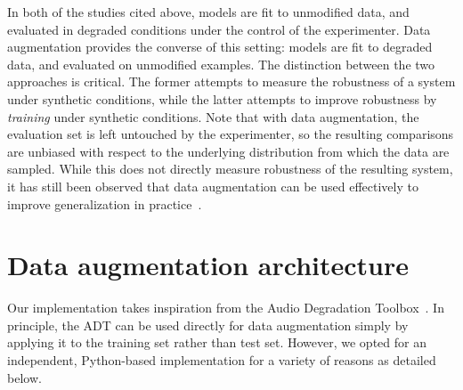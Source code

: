 \documentclass{article}
\begin{document}
In both of the studies cited above, models are fit to unmodified data, and evaluated in
degraded conditions under the control of the experimenter.  
Data augmentation provides the converse of this setting: models are fit to degraded data, 
and evaluated on unmodified examples.  The distinction between the two approaches is
critical.  The former attempts to measure the robustness of a system under synthetic
conditions, while the latter attempts to improve robustness by \emph{training} under
synthetic conditions. Note that with data augmentation, the evaluation set is left
untouched by the experimenter, so the resulting comparisons are unbiased with respect
to the underlying distribution from which the data are sampled.  While this does not
directly measure robustness of the resulting system, it has still been observed that data
augmentation can be used effectively to improve generalization in
practice~\cite{krizhevsky2012imagenet,he2015delving}.


\section{Data augmentation architecture}

%
%
Our implementation takes inspiration from the Audio Degradation
Toolbox~\cite{mauch2013audio}.  In principle, the ADT can be used directly 
for data augmentation simply by applying it to the training set rather than test set.
However, we opted for an independent, Python-based implementation for a variety of
reasons as detailed below.
\end{document}
